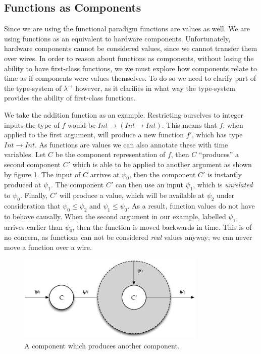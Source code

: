 \subsection{Functions as Components}
Since we are using the functional paradigm functions are values as well.
We are using functions as an equivalent to hardware components.
Unfortunately, hardware components cannot be considered values, since we cannot transfer them over wires.
In order to reason about functions as components, without losing the ability to have first-class functions, we we must explore how components relate to time as if components were values themselves.
To do so we need to clarify part of the type-system of $\lambda^\rightarrow$ however, as it clarifies in what way the type-system provides the ability of first-class functions.

We take the addition function as an example.
Restricting ourselves to integer inputs the type of $f$ would be $Int \rightarrow (Int \rightarrow Int)$.
This means that $f$, when applied to the first argument, will produce a new function $f'$, which has type $Int \rightarrow Int$.
As functions are values we can also annotate these with time variables.
Let $C$ be the component representation of $f$, then $C$ ``produces'' a second component $C'$ which is able to be applied to another argument as shown by figure \ref{fig:2arycomp}.
The input of $C$ arrives at $\psi_0$, then the component $C'$ is instantly produced at $\psi_1$.
The component $C'$ can then use an input $\psi_1$, which is \textit{unrelated} to $\psi_0$.
Finally, $C'$ will produce a value, which will be available at $\psi_2$ under consideration that $\psi_0 \le \psi_2$ and $\psi_1 \le \psi_0$.
As a result, function values do not have to behave causally.
When the second argument in our example, labelled $\psi_1$, arrives earlier than $\psi_0$, then the function is moved backwards in time.
This is of no concern, as functions can not be considered \textit{real} values anyway; we can never move a function over a wire.

\begin{figure}[h]
\centering
\includegraphics[width=0.8\textwidth]{images/2arycomp}
\caption{A component which produces another component.} \label{fig:2arycomp}
\end{figure}

